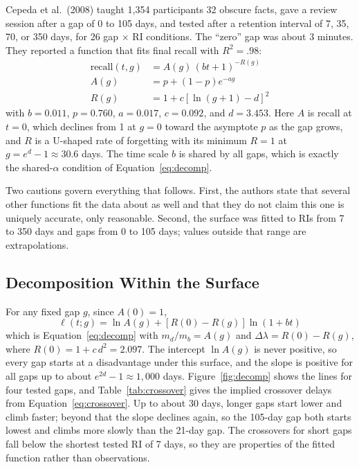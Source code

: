 \documentclass[10pt,twocolumn]{article}
\newcommand{\lr}{\ell}
\begin{document}
Cepeda et al.\ (2008) taught 1,354 participants 32 obscure facts, gave a review session after a gap of 0 to 105 days, and tested after a retention interval of 7, 35, 70, or 350 days, for 26 gap $\times$ RI conditions. The ``zero'' gap was about 3 minutes. They reported a function that fits final recall with $R^2 = .98$:
\begin{align}
\text{recall}(t, g) &= A(g)\,(bt + 1)^{-R(g)} \label{eq:cepeda_model}\\
A(g) &= p + (1 - p)e^{-ag} \label{eq:A_func} \\
R(g) &= 1 + c[\ln(g + 1) - d]^2 \label{eq:R_func}
\end{align}
with $b = 0.011$, $p = 0.760$, $a = 0.017$, $c = 0.092$, and $d = 3.453$. Here $A$ is recall at $t = 0$, which declines from 1 at $g = 0$ toward the asymptote $p$ as the gap grows, and $R$ is a U-shaped rate of forgetting with its minimum $R = 1$ at $g = e^d - 1 \approx 30.6$ days. The time scale $b$ is shared by all gaps, which is exactly the shared-$\alpha$ condition of Equation~\ref{eq:decomp}.

Two cautions govern everything that follows. First, the authors state that several other functions fit the data about as well and that they do not claim this one is uniquely accurate, only reasonable. Second, the surface was fitted to RIs from 7 to 350 days and gaps from 0 to 105 days; values outside that range are extrapolations.

\subsection{Decomposition Within the Surface}

For any fixed gap $g$, since $A(0) = 1$,
\begin{equation}
\lr(t; g) = \ln A(g) + [R(0) - R(g)]\ln(1 + bt)
\label{eq:cepeda_decomp}
\end{equation}
which is Equation~\ref{eq:decomp} with $m_d/m_b = A(g)$ and $\Delta\lambda = R(0) - R(g)$, where $R(0) = 1 + c\,d^2 = 2.097$. The intercept $\ln A(g)$ is never positive, so every gap starts at a disadvantage under this surface, and the slope is positive for all gaps up to about $e^{2d} - 1 \approx 1{,}000$ days. Figure~\ref{fig:decomp} shows the lines for four tested gaps, and Table~\ref{tab:crossover} gives the implied crossover delays from Equation~\ref{eq:crossover}. Up to about 30 days, longer gaps start lower and climb faster; beyond that the slope declines again, so the 105-day gap both starts lowest and climbs more slowly than the 21-day gap. The crossovers for short gaps fall below the shortest tested RI of 7 days, so they are properties of the fitted function rather than observations.
\end{document}
